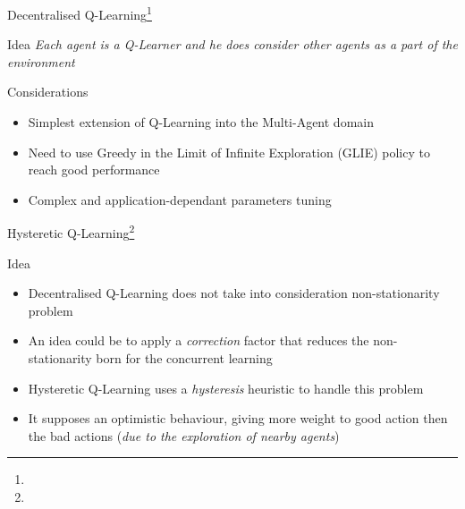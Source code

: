 \documentclass[presentation]{beamer}\mode<presentation>{\usetheme{AMSBolognaFC}}
\begin{document}
\begin{frame}{Decentralised Q-Learning\footnote{}}
	\begin{exampleblock}{Idea}
		\emph{Each agent is a Q-Learner and he does consider other agents as a part of the environment}
	\end{exampleblock}

	\begin{exampleblock}{Considerations}
		\begin{itemize}
			\item[{\color{teal} \faThumbsUp}] Simplest extension of Q-Learning into the Multi-Agent domain
			\item[{\color{red} \faThumbsDown}] Need to use Greedy in the Limit of Infinite Exploration (GLIE) policy to reach good performance
			\item[{\color{red} \faThumbsDown}] Complex and application-dependant parameters tuning
		\end{itemize}
	\end{exampleblock}
\end{frame}

\begin{frame}{Hysteretic Q-Learning\footnote[frame]{}}
	\begin{alertblock}{Idea}
		\begin{itemize}
			\item Decentralised Q-Learning does not take into consideration non-stationarity problem
			\item An idea could be to apply a \emph{correction} factor that reduces the non-stationarity born for the concurrent learning
			\item Hysteretic Q-Learning uses a \emph{hysteresis} heuristic to handle this problem
			\item It supposes an optimistic behaviour, giving more weight to good action then the bad actions (\emph{due to the exploration of nearby agents})
		\end{itemize}
	\end{alertblock}
\end{frame}
\end{document}
